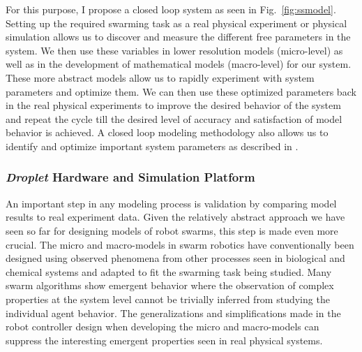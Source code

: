 \documentclass[11pt, onecolumn, compsoc, letterpaper]{article}
\begin{document}
For this purpose, I propose a closed loop system as seen in Fig.~\ref{fig:ssmodel}. Setting up the required swarming task as a real physical experiment or physical simulation allows us to discover and measure the different free parameters in the system. We then use these variables in lower resolution models (micro-level) as well as in the development of mathematical models (macro-level) for our system. These more abstract models allow us to rapidly experiment with system parameters and optimize them. We can then use these optimized parameters back in the real physical experiments to improve the desired behavior of the system and repeat the cycle till the desired level of accuracy and satisfaction of model behavior is achieved. A closed loop modeling methodology also allows us to identify and optimize important system parameters as described in \cite{Correll2006a,Correll2008}.

\subsubsection{\emph{Droplet} Hardware and Simulation Platform}
An important step in any modeling process is validation by comparing model results to real experiment data. Given the relatively abstract approach we have seen so far for designing models of robot swarms, this step is made even more crucial. The micro and macro-models in swarm robotics have conventionally been designed using observed phenomena from other processes seen in biological and chemical systems and adapted to fit the swarming task being studied. Many swarm algorithms show emergent behavior where the observation of complex properties at the system level cannot be trivially inferred from studying the individual agent behavior. The generalizations and simplifications made in the robot controller design when developing the micro and macro-models can suppress the interesting emergent properties seen in real physical systems.
\end{document}
